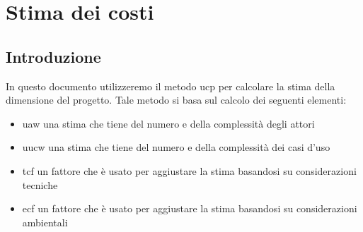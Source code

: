 \chapter{Stima dei costi}

\section{Introduzione}
In questo documento utilizzeremo il metodo \gls{ucp} per calcolare la stima della dimensione del progetto. Tale metodo si basa sul calcolo dei seguenti elementi:
\begin{itemize}
	\item \gls{uaw} una stima che tiene del numero e della complessità degli attori
	\item \gls{uucw} una stima che tiene del numero e della complessità dei casi d'uso
	\item \gls{tcf} un fattore che è usato per aggiustare la stima basandosi su considerazioni tecniche
	\item \gls{ecf} un fattore che è usato per aggiustare la stima basandosi su considerazioni ambientali
\end{itemize}

